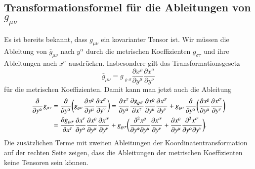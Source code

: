 \subsection{Transformationsformel für die Ableitungen von $g_{\mu\nu}$}
Es ist bereits bekannt, dass $g_{\mu\nu}$ ein kovarianter Tensor ist.
Wir müssen die Ableitung von $\bar g_{\mu\nu}$ nach $y^\alpha$ durch
die metrischen Koeffizienten $g_{\sigma\tau}$ und ihre Ableitungen
nach $x^\sigma$ ausdrücken.
Insbesondere gilt das Transformationsgesetz
\begin{equation*}
\bar g_{\mu\nu}
=
g_{\varrho\sigma}
\frac{\partial x^\varrho}{\partial y^\mu}
\frac{\partial x^\sigma}{\partial y^\nu}
\end{equation*}
für die metrischen Koeffizienten. 
Damit kann man jetzt auch die Ableitung 
\begin{align}
\frac{\partial}{\partial y^\alpha}\bar g_{\mu\nu}
&=
\frac{\partial}{\partial y^\alpha} 
\biggl(
g_{\varrho\sigma}
\frac{\partial x^\varrho}{\partial y^\mu}
\frac{\partial x^\sigma}{\partial y^\nu}
\biggr)
=
\frac{\partial x^\tau}{\partial y^\alpha}
\frac{\partial g_{\varrho\sigma} }{\partial x^\tau}
\frac{\partial x^\varrho}{\partial y^\mu}
\frac{\partial x^\sigma}{\partial y^\nu}
+
g_{\varrho\sigma}
\frac{\partial}{\partial y^\alpha} 
\biggl(
\frac{\partial x^\varrho}{\partial y^\mu}
\frac{\partial x^\sigma}{\partial y^\nu}
\biggr)
\notag
\\
&=
\frac{\partial g_{\varrho\sigma}}{\partial x^\tau}
\frac{\partial x^\tau}{\partial y^\alpha}
\frac{\partial x^\varrho}{\partial y^\mu}
\frac{\partial x^\sigma}{\partial y^\nu}
+
g_{\varrho\sigma}
\biggl(
\frac{\partial^2 x^\varrho}{\partial y^\alpha\partial y^\mu}
\frac{\partial x^\sigma}{\partial y^\nu}
+
\frac{\partial x^\varrho}{\partial y^\mu}
\frac{\partial^2 x^\sigma}{\partial y^\alpha\partial y^\nu}
\biggr).
\label{skript:trafo:gabl}
\end{align}
Die zusätzlichen Terme mit zweiten Ableitungen der Koordinatentransformation
auf der rechten Seite zeigen, dass die Ableitungen der metrischen Koeffizienten
keine Tensoren sein können.

